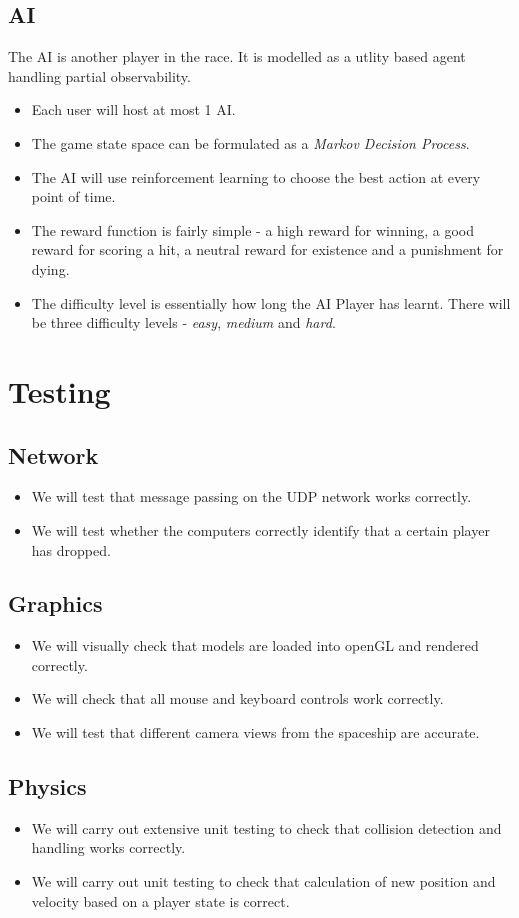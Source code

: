 \documentclass[]{article}
\begin{document}
\subsection{AI}
The AI is another player in the race. It is modelled as a utlity based agent handling partial observability.
\begin{itemize}
\item Each user will host at most 1 AI. 
\item The game state space can be formulated as a \emph{Markov Decision Process}. 
\item The AI will use reinforcement learning to choose the best action at every point of time. 
\item The reward function is fairly simple - a high reward for winning, a good reward for scoring a hit, a neutral reward for existence and a punishment for dying.
\item The difficulty level is essentially how long the AI Player has learnt. There will be three difficulty levels - \emph{easy}, \emph{medium} and \emph{hard}.
\end{itemize} 
\section{Testing}
\subsection{Network}
\begin{itemize}
\item We will test that message passing on the UDP network works correctly.
\item We will test whether the computers correctly identify that a certain player has dropped.
\end{itemize}
\subsection{Graphics}
\begin{itemize}
\item We will visually check that models are loaded into openGL and rendered correctly.
\item We will check that all mouse and keyboard controls work correctly.
\item We will test that different camera views from the spaceship are accurate.
\end{itemize}
\subsection{Physics}
\begin{itemize}
\item We will carry out extensive unit testing to check that collision detection and handling works correctly.
\item We will carry out unit testing to check that calculation of new position and velocity based on a player state is correct.
\end{itemize}
\end{document}
